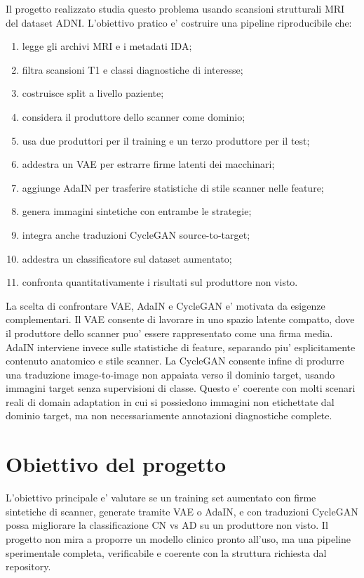 \documentclass[12pt,a4paper]{article}
\begin{document}
Il progetto realizzato studia questo problema usando scansioni strutturali MRI del dataset ADNI. L'obiettivo pratico e' costruire una pipeline riproducibile che:

\begin{enumerate}[leftmargin=1.2cm]
    \item legge gli archivi MRI e i metadati IDA;
    \item filtra scansioni T1 e classi diagnostiche di interesse;
    \item costruisce split a livello paziente;
    \item considera il produttore dello scanner come dominio;
    \item usa due produttori per il training e un terzo produttore per il test;
    \item addestra un VAE per estrarre firme latenti dei macchinari;
    \item aggiunge AdaIN per trasferire statistiche di stile scanner nelle feature;
    \item genera immagini sintetiche con entrambe le strategie;
    \item integra anche traduzioni CycleGAN source-to-target;
    \item addestra un classificatore sul dataset aumentato;
    \item confronta quantitativamente i risultati sul produttore non visto.
\end{enumerate}

La scelta di confrontare VAE, AdaIN e CycleGAN e' motivata da esigenze complementari. Il VAE consente di lavorare in uno spazio latente compatto, dove il produttore dello scanner puo' essere rappresentato come una firma media. AdaIN interviene invece sulle statistiche di feature, separando piu' esplicitamente contenuto anatomico e stile scanner. La CycleGAN consente infine di produrre una traduzione image-to-image non appaiata verso il dominio target, usando immagini target senza supervisioni di classe. Questo e' coerente con molti scenari reali di domain adaptation in cui si possiedono immagini non etichettate dal dominio target, ma non necessariamente annotazioni diagnostiche complete.

\section{Obiettivo del progetto}

L'obiettivo principale e' valutare se un training set aumentato con firme sintetiche di scanner, generate tramite VAE o AdaIN, e con traduzioni CycleGAN possa migliorare la classificazione CN vs AD su un produttore non visto. Il progetto non mira a proporre un modello clinico pronto all'uso, ma una pipeline sperimentale completa, verificabile e coerente con la struttura richiesta dal repository.
\end{document}
